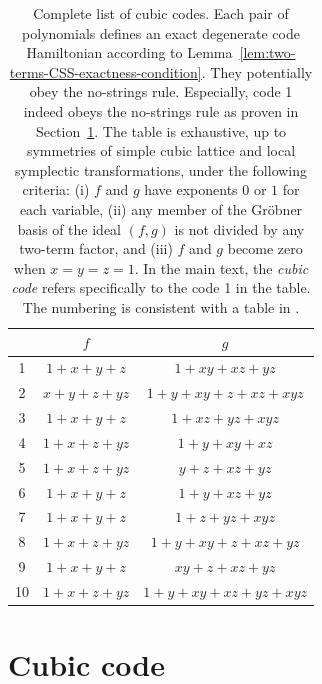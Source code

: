 \begin{table}[htbp]
\centering
\begin{tabular}{c|c|c}
\hline
   & $f$ & $g$ \\
\hline
1 & $1+x+y+z$ & $1+x y+x z+y z$ \\
2 & $x+y+z+y z$ & $1+y+x y+z+x z+x y z$ \\
3 & $1+x+y+z$ & $1+x z+y z+x y z$ \\
4 & $1+x+z+y z$ & $1+y+x y+x z$ \\
5 & $1+x+z+y z$ & $y+z+x z+y z$ \\
6 & $1+x+y+z$ & $1+y+x z+y z$ \\
7 & $1+x+y+z$ & $1+z+y z+x y z$ \\
8 & $1+x+z+y z$ & $1+y+x y+z+x z+y z$ \\
9 & $1+x+y+z$ & $x y+z+x z+y z$ \\
10 & $1+x+z+y z$ & $1+y+x y+x z+y z+x y z$ \\
\hline
\end{tabular}
\caption{Complete list of cubic codes. 
Each pair of polynomials defines an exact degenerate code Hamiltonian
according to Lemma~\ref{lem:two-terms-CSS-exactness-condition}.
They potentially obey the no-strings rule.
Especially, code 1 indeed obeys the no-strings rule as proven in Section~\ref{sec:cubic-code}.
The table is exhaustive, up to symmetries of simple cubic lattice and local symplectic transformations,
under the following criteria:
(i) $f$ and $g$ have exponents $0$ or $1$ for each variable,
(ii) any member of the Gr\"obner basis of the ideal $(f,g)$ is not divided by any two-term factor, and
(iii) $f$ and $g$ become zero when $x=y=z=1$.
In the main text, the {\em cubic code} refers specifically to the code 1 in the table.
The numbering is consistent with a table in \cite{Haah2011Local}.}
\label{tb:10-models-wo-string}
\end{table}

\section{Cubic code}
\label{sec:cubic-code}


